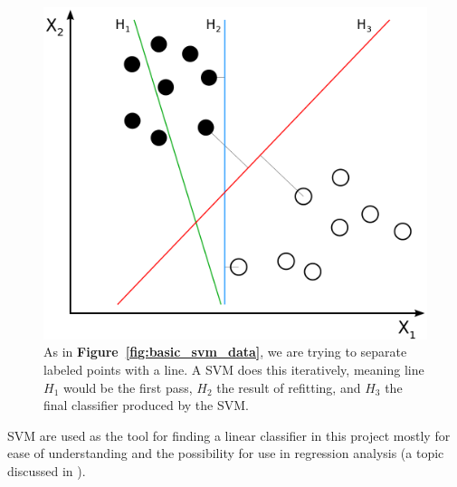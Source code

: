 \documentclass[11pt]{article} %
\begin{document}
\begin{figure}[h]
  \centering
  \includegraphics[scale=.5]{images/Svm_separating_hyperplanes.png}
  \caption{As in \textbf{Figure~\ref{fig:basic_svm_data}}, we are trying to separate
    labeled points with a line. A SVM does this iteratively, meaning line $H_1$
    would be the first pass, $H_2$ the result of refitting, and $H_3$ the final 
    classifier produced by the SVM.}
  \label{fig:training_hyperplanes}
\end{figure}

SVM are used as the tool for finding a linear classifier in this project mostly
for ease of understanding and the possibility for use in regression analysis
(a topic discussed in \cite{chang2011libsvm}). 


% 

%
\end{document}
